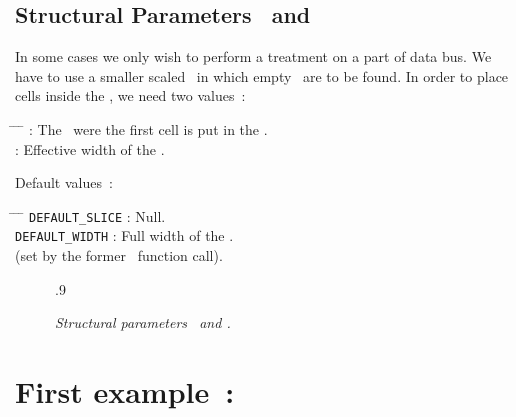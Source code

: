    \subsection{Structural Parameters \Width\ and \Slice}
   \begin{minipage}[t]{\textwidth}
     \forceindent
       In some cases we only wish to perform a treatment on a part of data
     bus. We have to use a smaller scaled \operator\ in which empty \slices\
     are to be found. In order to place cells inside the \column, we need
     two values~:
     \begin{tabbing}
       \hspace{\sizeindentation} \= %
       \hspace{1.5cm}      \= %
       \hspace{0.4cm}      \= \kill
       \> \Slice \> : \> The \slice\ were the first cell is put in the
                         \column.\\
       \> \Width \> : \> Effective width of the \operator.
     \end{tabbing}
     Default values~:
     \begin{tabbing}
       \hspace{\sizeindentation} \= %
       \hspace{2.5cm}      \= %
       \hspace{0.4cm}      \= \kill
       \> {\tt DEFAULT\_SLICE} \> : \> Null.\\
       \> {\tt DEFAULT\_WIDTH} \> : \> Full width of the \datapath.\\
       \> \> \> (set by the former \DPDEFLOFIG\ function call).
     \end{tabbing}
   \end{minipage}
   \begin{figure}[H]
     \begin{center}
       \leavevmode\epsfysize.9\textwidth{}
     \end{center}
     \nopagebreak
     \caption{
       \label{paramstruct}
       {\it Structural parameters \Width\ and \Slice.}}
   \end{figure}
   \section{First example~: \sampledpt}
